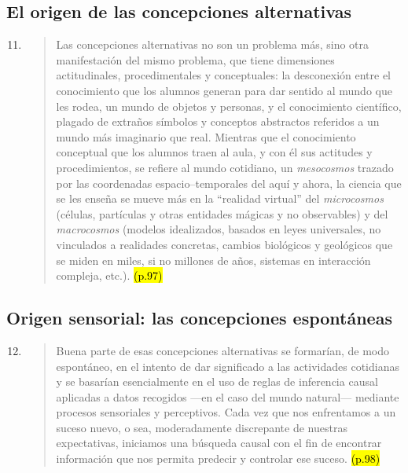 \documentclass{article}
\begin{document}
\subsection*{El origen de las concepciones alternativas}

\begin{enumerate}
  \setcounter{enumi}{10}

  \item \begin{quote}
  Las concepciones alternativas no son un problema más, sino otra manifestación del mismo problema, que tiene dimensiones actitudinales, procedimentales y conceptuales: la desconexión entre el conocimiento que los alumnos generan para dar sentido al mundo que les rodea, un mundo de objetos y personas, y el conocimiento científico, plagado de extraños símbolos y conceptos abstractos referidos a un mundo más imaginario que real. Mientras que el conocimiento conceptual que los alumnos traen al aula, y con él sus actitudes y procedimientos, se refiere al mundo cotidiano, un \textit{mesocosmos} trazado por las coordenadas espacio–temporales del aquí y ahora, la ciencia que se les enseña se mueve más en la “realidad virtual” del \textit{microcosmos} (células, partículas y otras entidades mágicas y no observables) y del \textit{macrocosmos} (modelos idealizados, basados en leyes universales, no vinculados a realidades concretas, cambios biológicos y geológicos que se miden en miles, si no millones de años, sistemas en interacción compleja, etc.). \hl{(p.97)}
  \end{quote}
\end{enumerate}

\subsection*{Origen sensorial: las concepciones espontáneas}

\begin{enumerate}
  \setcounter{enumi}{11}
\item \begin{quote} Buena parte de esas concepciones alternativas se formarían, de modo espontáneo, en el intento de dar significado a las actividades cotidianas y se basarían esencialmente en el uso de reglas de inferencia causal aplicadas a datos recogidos —en el caso del mundo natural— mediante procesos sensoriales y perceptivos. Cada vez que nos enfrentamos a un suceso nuevo, o sea, moderadamente discrepante de nuestras expectativas, iniciamos una búsqueda causal con el fin de encontrar información que nos permita predecir y controlar ese suceso. \hl{(p.98)}
\end{quote}
\end{enumerate}
\end{document}
